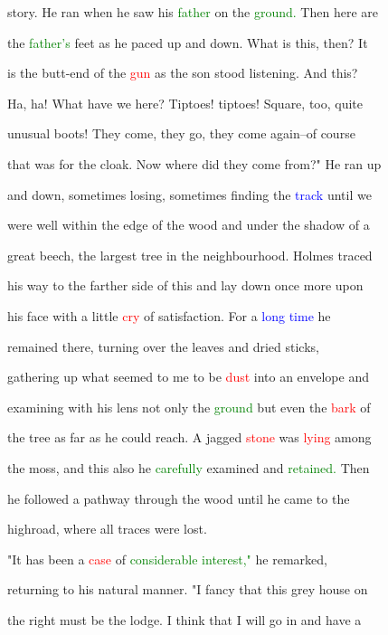  story. He ran when he saw his \textcolor{green}{father} on the \textcolor{green}{ground.} Then here are

 the \textcolor{green}{father's} feet as he paced up and down. What is this, then? It

 is the butt-end of the \textcolor{red}{gun} as the son stood listening. And this?

 Ha, ha! What have we here? Tiptoes! tiptoes! Square, too, quite

 unusual boots! They come, they go, they come again--of course

 that was for the cloak. Now where did they come from?" He ran up

 and down, sometimes \textcolor{BurntOrange}{losing,} sometimes finding the \textcolor{blue}{track} until we

 were well within the edge of the wood and under the shadow of a

 great beech, the largest \textcolor{BurntOrange}{tree} in the neighbourhood. Holmes traced

 his way to the farther side of this and lay down once more upon

 his face with a little \textcolor{red}{cry} of satisfaction. For a \textcolor{blue}{long} \textcolor{blue}{time} he

 remained there, turning over the leaves and dried sticks,

 gathering up what seemed to me to be \textcolor{red}{dust} into an envelope and

 examining with his lens not only the \textcolor{green}{ground} but even the \textcolor{red}{bark} of

 the \textcolor{BurntOrange}{tree} as far as he could reach. A jagged \textcolor{red}{stone} was \textcolor{red}{lying} among

 the moss, and this also he \textcolor{green}{carefully} examined and \textcolor{green}{retained.} Then

 he followed a pathway through the wood until he came to the

 highroad, where all traces were \textcolor{BurntOrange}{lost.}



 "It has been a \textcolor{red}{case} of \textcolor{green}{considerable} \textcolor{green}{interest,"} he remarked,

 returning to his natural manner. "I \textcolor{BurntOrange}{fancy} that this grey house on

 the right must be the lodge. I think that I will go in and have a

